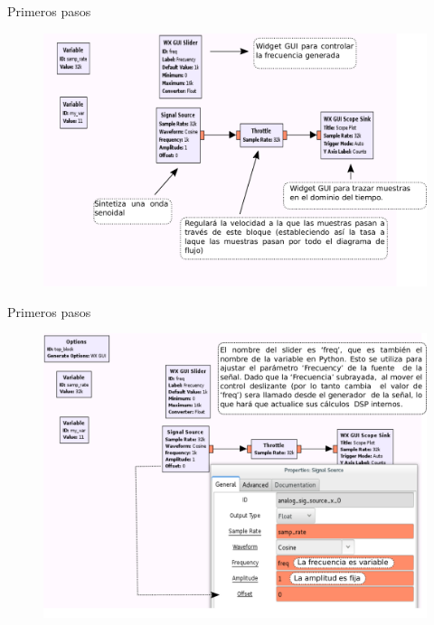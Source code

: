 \begin{frame}{Primeros pasos }
\begin{figure}[H]
\vspace{-3mm}
\centering
\includegraphics[width=\textwidth]{parte1/lab1/pdf/lab1_11.pdf}
\end{figure}
\end{frame}

\begin{frame}{Primeros pasos }
\begin{figure}[H]
\vspace{-3mm}
\centering
\includegraphics[width=.85\textwidth]{parte1/lab1/pdf/lab1_12.pdf}
\end{figure}
\end{frame}

